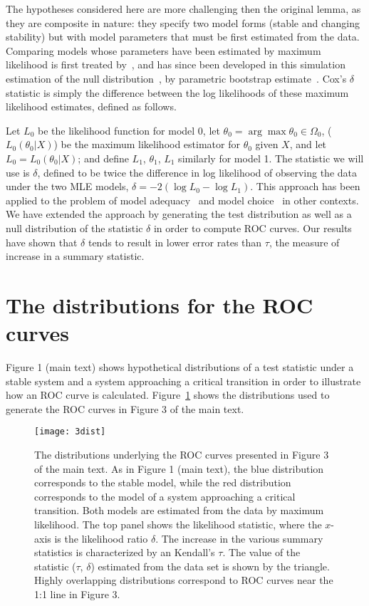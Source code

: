 \documentclass[authoryear, preprint,review,12pt]{elsarticle}
\begin{document}
The hypotheses considered here are more challenging then the original lemma, as they are composite in nature:
they specify two model forms (stable and changing stability)
but with model parameters that must be first estimated from the data.
Comparing models whose parameters have been estimated by maximum likelihood is first treated by~\citet{Cox1961, Cox1962},
and has since been developed in this simulation estimation of the null distribution~\citep{McLachlan1987}, by parametric bootstrap estimate~\citep{Efron1987}.  
Cox's $\delta$ statistic is simply the difference between the log likelihoods of these maximum likelihood estimates, defined as follows.

Let $L_0$ be the likelihood function for model 0, 
let $\theta_0 = \arg \max \theta_0 \in \Omega_0$, ($L_0 (\theta_0 |X)$) 
be the maximum likelihood estimator for $\theta_0$ given $X$, and let $L_0 = L_0 (\theta_0 |X)$; 
and define $L_1$, $\theta_1$, $L_1$ similarly for model 1. 
The statistic we will use is $\delta$, 
defined to be twice the difference in log likelihood of observing the data under the two MLE models,
$\delta = -2 (\log L_0 - \log L_1 )$.  
This approach has been applied to the problem of model adequacy~\citep{Goldman1993} and model choice~\citep{Huelsenbeck1996} in other contexts.  
We have extended the approach by generating the test distribution as well as a null distribution of the statistic $\delta$ in order to compute ROC curves.  
Our results have shown that $\delta$ tends to result in lower error rates than $\tau$, the measure of increase in a summary statistic.  


\pagebreak
\section{The distributions for the ROC curves}
Figure 1 (main text) shows hypothetical distributions of a test statistic under a stable system and a system approaching a critical transition in order to illustrate how an ROC curve is calculated.  Figure~\ref{fig:3dist} shows the distributions used to generate the ROC curves in Figure 3 of the main text.  

\begin{figure}[!ht]
  \begin{center}
    \texttt{[image: 3dist]}
  \end{center}
  \caption{The distributions underlying the ROC curves presented in Figure 3 of the main text.  As in Figure 1 (main text), the blue distribution corresponds to the stable model, while the red distribution corresponds to the model of a system approaching a critical transition.  Both models are estimated from the data by maximum likelihood.  The top panel shows the likelihood statistic, where the $x$-axis is the likelihood ratio $\delta$.  The increase in the various summary statistics is characterized by an Kendall's $\tau$.  The value of the statistic ($\tau$, $\delta$) estimated from the data set is shown by the triangle. Highly overlapping distributions correspond to ROC curves near the 1:1 line in Figure 3.}
  \label{fig:3dist}
\end{figure}
\end{document}
